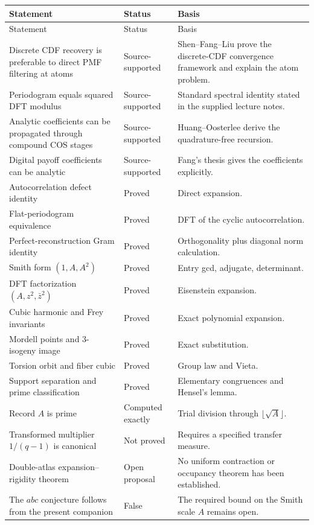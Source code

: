 \documentclass[11pt]{article}
\begin{document}
\begin{longtable}{>{\raggedright\arraybackslash}p{}>{\raggedright\arraybackslash}p{}>{\raggedright\arraybackslash}p{}}
\toprule
Statement & Status & Basis\\
\midrule
\endfirsthead
\toprule
Statement & Status & Basis\\
\midrule
\endhead
Discrete CDF recovery is preferable to direct PMF filtering at atoms & Source-supported & Shen--Fang--Liu prove the discrete-CDF convergence framework and explain the atom problem.\\
Periodogram equals squared DFT modulus & Source-supported & Standard spectral identity stated in the supplied lecture notes.\\
Analytic coefficients can be propagated through compound COS stages & Source-supported & Huang--Oosterlee derive the quadrature-free recursion.\\
Digital payoff coefficients can be analytic & Source-supported & Fang's thesis gives the coefficients explicitly.\\
Autocorrelation defect identity & Proved & Direct expansion.\\
Flat-periodogram equivalence & Proved & DFT of the cyclic autocorrelation.\\
Perfect-reconstruction Gram identity & Proved & Orthogonality plus diagonal norm calculation.\\
Smith form $(1,A,A^2)$ & Proved & Entry gcd, adjugate, determinant.\\
DFT factorization $(A,z^2,\bar z^2)$ & Proved & Eisenstein expansion.\\
Cubic harmonic and Frey invariants & Proved & Exact polynomial expansion.\\
Mordell points and $3$-isogeny image & Proved & Exact substitution.\\
Torsion orbit and fiber cubic & Proved & Group law and Vieta.\\
Support separation and prime classification & Proved & Elementary congruences and Hensel's lemma.\\
Record $A$ is prime & Computed exactly & Trial division through $\lfloor\sqrt A\rfloor$.\\
Transformed multiplier $1/(q-1)$ is canonical & Not proved & Requires a specified transfer measure.\\
Double-atlas expansion--rigidity theorem & Open proposal & No uniform contraction or occupancy theorem has been established.\\
The $abc$ conjecture follows from the present companion & False & The required bound on the Smith scale $A$ remains open.\\
\bottomrule
\end{longtable}
\end{document}
